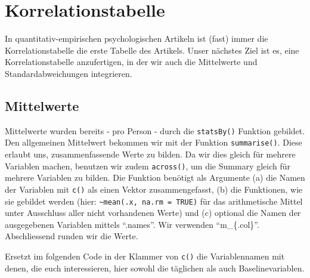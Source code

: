 \documentclass[
  letterpaper,
  DIV=11,
  numbers=noendperiod]{scrreprt}
\newenvironment{Shaded}{\begin{snugshade}}{\end{snugshade}}
\newcommand{\AttributeTok}[1]{\textcolor[rgb]{0.40,0.45,0.13}{#1}}
\newcommand{\ConstantTok}[1]{\textcolor[rgb]{0.56,0.35,0.01}{#1}}
\newcommand{\FunctionTok}[1]{\textcolor[rgb]{0.28,0.35,0.67}{#1}}
\newcommand{\NormalTok}[1]{\textcolor[rgb]{0.00,0.23,0.31}{#1}}
\newcommand{\OtherTok}[1]{\textcolor[rgb]{0.00,0.23,0.31}{#1}}
\newcommand{\SpecialCharTok}[1]{\textcolor[rgb]{0.37,0.37,0.37}{#1}}
\begin{document}
\section{Korrelationstabelle}\label{korrelationstabelle}

In quantitativ-empirischen psychologischen Artikeln ist (fast) immer die
Korrelationstabelle die erste Tabelle des Artikels. Unser nächstes Ziel
ist es, eine Korrelationstabelle anzufertigen, in der wir auch die
Mittelwerte und Standardabweichungen integrieren.

\subsection{Mittelwerte}\label{mittelwerte}

Mittelwerte wurden bereits - pro Person - durch die \texttt{statsBy()}
Funktion gebildet. Den allgemeinen Mittelwert bekommen wir mit der
Funktion \texttt{summarise()}. Diese erlaubt uns, zusammenfassende Werte
zu bilden. Da wir dies gleich für mehrere Variablen machen, benutzen wir
zudem \texttt{across()}, um die Summary gleich für mehrere Variablen zu
bilden. Die Funktion benötigt als Argumente (a) die Namen der Variablen
mit \texttt{c()} als einen Vektor zusammengefasst, (b) die Funktionen,
wie sie gebildet werden (hier:
\texttt{\textasciitilde{}mean(.x,\ na.rm\ =\ TRUE)} für das
arithmetische Mittel unter Ausschluss aller nicht vorhandenen Werte) und
(c) optional die Namen der ausgegebenen Variablen mittels ``.names''.
Wir verwenden ``m\_\{.col\}''. Abschliessend runden wir die Werte.

Ersetzt im folgenden Code in der Klammer von \texttt{c()} die
Variablennamen mit denen, die euch interessieren, hier sowohl die
täglichen als auch Baselinevariablen.

\begin{Shaded}
\end{Shaded}
\end{document}
